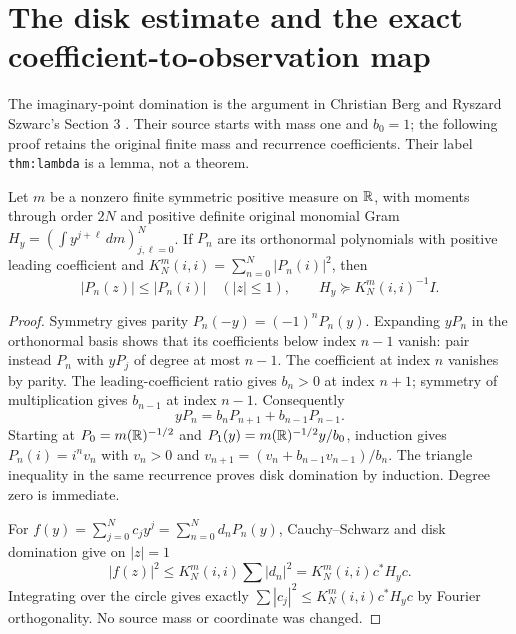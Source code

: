 \section{The disk estimate and the exact coefficient-to-observation map}

The imaginary-point domination is the argument in Christian Berg and
Ryszard Szwarc's Section 3 \cite{lgamma:BS}.  Their source starts with mass one
and $b_0=1$; the following proof retains the original finite mass and
recurrence coefficients.  Their label \texttt{thm:lambda} is a lemma,
not a theorem.

\begin{lgammalemma}\label{lgamma:lem:disk}
Let $m$ be a nonzero finite symmetric positive measure on $\mathbb R$, with
moments through order $2N$ and positive definite original monomial Gram
$H_y=(\int y^{j+\ell}\,dm)_{j,\ell=0}^N$.  If $P_n$ are its
orthonormal polynomials with positive leading coefficient and
$K_N^m(i,i)=\sum_{n=0}^N|P_n(i)|^2$, then
\begin{equation}\label{lgamma:eq:diskgram}
 |P_n(z)|\le|P_n(i)|\quad(|z|\le1),\qquad
 H_y\succeq K_N^m(i,i)^{-1}I.
\end{equation}
\end{lgammalemma}
\begin{proof}
Symmetry gives parity $P_n(-y)=(-1)^nP_n(y)$.  Expanding $yP_n$ in
the orthonormal basis shows that its coefficients below index $n-1$
vanish: pair instead $P_n$ with $yP_j$ of degree at most $n-1$.
The coefficient at index $n$ vanishes by parity.  The leading-coefficient
ratio gives $b_n>0$ at index $n+1$; symmetry of multiplication gives
$b_{n-1}$ at index $n-1$.  Consequently
\[
 yP_n=b_nP_{n+1}+b_{n-1}P_{n-1}.
\]
Starting at $P_0=m(\mathbb R)^{-1/2}$ and
$P_1(y)=m(\mathbb R)^{-1/2}y/b_0$, induction gives
$P_n(i)=i^nv_n$ with $v_n>0$ and
$v_{n+1}=(v_n+b_{n-1}v_{n-1})/b_n$.
The triangle inequality in the same recurrence proves disk domination
by induction.  Degree zero is immediate.

For $f(y)=\sum_{j=0}^Nc_jy^j=\sum_{n=0}^Nd_nP_n(y)$,
Cauchy--Schwarz and disk domination give on $|z|=1$
\[
 |f(z)|^2\le K_N^m(i,i)\sum|d_n|^2
 =K_N^m(i,i)c^*H_yc.
\]
Integrating over the circle gives exactly
$\sum|c_j|^2\le K_N^m(i,i)c^*H_yc$ by Fourier orthogonality.
No source mass or coordinate was changed.
\end{proof}

